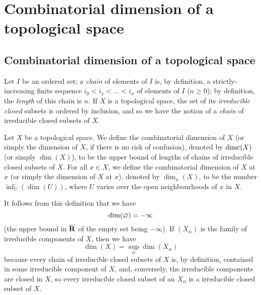\section{Combinatorial dimension of a topological space}
\label{section:combinatorial-dimension-of-a-topological-space}


\subsection{Combinatorial dimension of a topological space}
\label{subsection:combinatorial-dimension-of-a-topological-space}

\begin{env}[14.1.1]
\label{0.14.1.1}
Let $I$ be an ordered set;
a \emph{chain} of elements of $I$ is, by definition, a strictly-increasing finite sequence $i_0<i_1<\ldots<i_n$ of elements of $I$ ($n\geq0$);
by definition, the \emph{length} of this chain is $n$.
If $X$ is a topological space, the set of its \emph{irreducible closed} subsets is ordered by inclusion, and so we have the notion of a \emph{chain} of irreducible closed subsets of $X$.
\end{env}

\begin{defn}[14.1.2]
\label{0.14.1.2}
Let $X$ be a topological space.
We define the combinatorial dimension of $X$ (or simply the dimension of $X$, if there is no risk of confusion), denoted by ${\mathop{\mathrm{dimc}}\nolimits}(X)$ (or simply $\dim(X)$), to be the upper bound of lengths of chains of irreducible closed subsets of $X$.
For all $x\in X$, we define the combinatorial dimension of $X$ at $x$ (or simply the dimension of $X$ at $x$), denoted by $\dim_x(X)$, to be the number $\inf_U(\dim(U))$, where $U$ varies over the open neighbourhoods of $x$ in $X$.
\end{defn}

It follows from this definition that we have
\[
    {\mathop{\mathrm{dim}}\nolimits}(\varnothing) = -\infty
\]
(the upper bound in $\overline{\mathbf{R}}$ of the empty set being $-\infty$).
If $(X_\alpha)$ is the family of irreducible components of $X$, then we have
\begin{equation*}
\label{0.14.1.2.1}
    \dim(X) = \sup_\alpha\dim(X_\alpha)\tag{14.1.2.1}
\end{equation*}
because every chain of irreducible closed subsets of $X$ is, by definition, contained in some irreducible component of $X$, and, conversely, the irreducible components are closed in $X$, so every irreducible closed subset of an $X_\alpha$ is a irreducible closed subset of $X$.

